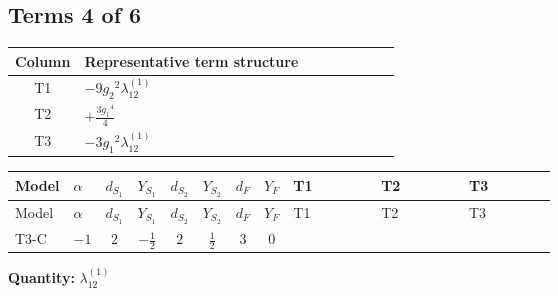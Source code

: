 \documentclass[8pt]{article}
\begin{document}
\begin{landscape}
\subsection*{Terms 4 of 6}
\begin{center}
\begin{tabular}{@{}c >{\raggedright\arraybackslash}p{0.82\linewidth}@{}}
\toprule
Column & Representative term structure \\
\midrule
T1 & \(\displaystyle -9 {g_2}^2 {\lambda_{12}^{(1)}}\) \\
\midrule
T2 & \(\displaystyle +\frac{3 {g_1}^4}{4}\) \\
\midrule
T3 & \(\displaystyle -3 {g_1}^2 {\lambda_{12}^{(1)}}\) \\
\midrule
\bottomrule
\end{tabular}
\end{center}
\smallskip
\tiny
\begin{longtable}{@{}llcccccc >{\raggedright\arraybackslash}p{0.21\linewidth} >{\raggedright\arraybackslash}p{0.21\linewidth} >{\raggedright\arraybackslash}p{0.21\linewidth}@{}}
\toprule
Model & $\alpha$ & $d_{S_1}$ & $Y_{S_1}$ & $d_{S_2}$ & $Y_{S_2}$ & $d_F$ & $Y_F$ & T1 & T2 & T3 \\
\midrule
\endfirsthead
\toprule
Model & $\alpha$ & $d_{S_1}$ & $Y_{S_1}$ & $d_{S_2}$ & $Y_{S_2}$ & $d_F$ & $Y_F$ & T1 & T2 & T3 \\
\midrule
\endhead
T3-C & $-1$ & $2$ & $-\frac{1}{2}$ & $2$ & $\frac{1}{2}$ & $3$ & $0$ & \scriptsize\adjustbox{max width=\linewidth}{$\begin{gathered} -9 {g_2}^2 {\lambda_{12}^{(1)}}\end{gathered}$} & \scriptsize\adjustbox{max width=\linewidth}{$\begin{gathered} +\frac{3 {g_1}^4}{4}\end{gathered}$} & \scriptsize\adjustbox{max width=\linewidth}{$\begin{gathered} -3 {g_1}^2 {\lambda_{12}^{(1)}}\end{gathered}$} \\
\midrule
\bottomrule
\end{longtable}
\clearpage
\noindent\textbf{Quantity: }$\lambda_{12}^{(1)}$\par\smallskip

\end{landscape}
\end{document}
